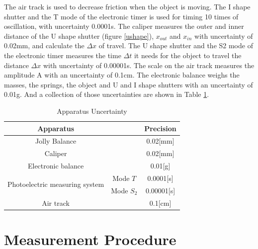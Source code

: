 \documentclass[11pt,a4paper]{article}
\begin{document}
 The air track is used to decrease friction when the object is moving. The I shape shutter and the T mode of the electronic timer is used for timing 10 times of oscillation, with uncertainty 0.0001s. The caliper measures the outer and inner distance of the U shape shutter (figure \ref{ushape}), $x_{out}$ and $x_{in}$ with uncertainty of 0.02mm, and calculate the $\Delta x$ of travel. The U shape shutter and the S2 mode of the electronic timer measures the time $\Delta t$ it needs for the object to travel the distance $\Delta x$ with uncertainty of 0.00001s. The scale on the air track measures the amplitude A with an uncertainty of 0.1cm. The electronic balance weighs the masses, the springs, the object and U and I shape shutters with an uncertainty of 0.01g.
And a collection of those uncertainties are shown in Table \ref{apparatus}.

\begin{table}[h]
    \centering
    \begin{tabular}{ccc}
        \toprule
    \textbf{Apparatus}   &         & \textbf{Precision} \\\hline
    \midrule    
    Jolly Balance                    &          & 0.02{[}mm{]}       \\
    Caliper                              &      & 0.02{[}mm{]}       \\
    Electronic balance                   &      & 0.01{[}g{]}        \\
    \multirow{2}{*}{Photoelectric measuring system} & Mode $T$   & 0.0001{[}s{]}       \\
                                   & Mode $S_2$ & 0.00001{[}s{]}     \\
    Air track                         &         & 0.1{[}cm{]}       \\\bottomrule
    \end{tabular}
    \caption{Apparatus Uncertainty}
    \label{apparatus}
    \end{table}


\section{Measurement Procedure}
\end{document}
